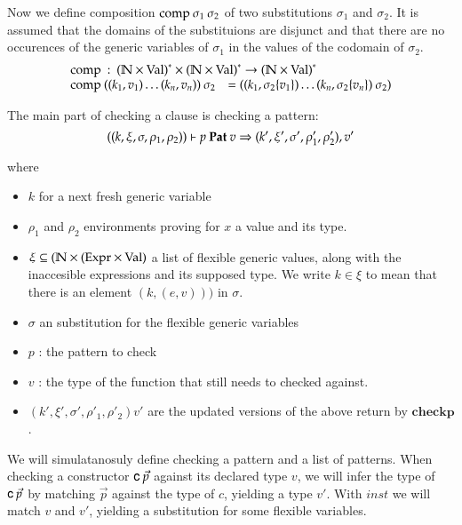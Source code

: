 Now we define composition $\mathrm{comp}\:\sigma_1\:\sigma_2$ of two substitutions $\sigma_1$ and $\sigma_2$.
It is assumed that the domains of the substituions are disjunct and that there are no occurences of the generic variables of $\sigma_1$ in the values of the codomain of $\sigma_2$.  
\[
\begin{array}{ll}
\multicolumn{2}{l}{\compS : \ves{(\cN \times \Val)} \times \ves{(\cN \times \Val)} \ra \ves{(\cN \times \Val)}} \\
\compS{((k_1,v_1)\ldots(k_n,v_n))}{\sigma_2} & = ((k_1,\subst{\sigma_2}{v_1})\ldots(k_n,\subst{\sigma_2}{v_n})\: \sigma_2) 
\end{array}
\]

The main part of checking a clause is checking a pattern:
\[
((k,\xi,\sigma,\rho_1,\rho_2))\vdash p\:\mathbf{Pat}\:v\Rightarrow (k',\xi',\sigma',\rho'_1,\rho'_2),v'
\]

where
\begin{itemize}
\item
$k$ for a next fresh generic variable
\item
$\rho_1$ and $\rho_2$ environments proving for $x$ a value and its type.
\item
$\xi \subseteq (\mathbb{N} \times (\mathrm{Expr} \times \mathrm{Val})$ a list of flexible generic values, along with the inaccesible expressions and its supposed type. We write $k \in \xi$ to mean that there is an element $(k,(e,v)))$ in $\sigma$. 
\item
$\sigma$ an substitution for the flexible generic variables
\item
$p$ : the pattern to check
\item
$v$ : the type of the function that still needs to checked against.
\item
$(k',\xi',\sigma',\rho'_1,\rho'_2){v'}$ are the updated versions of the above return by $\mathbf{checkp}$.
\end{itemize}

We will simulatanosuly define checking a pattern and a list of patterns.
When checking a constructor $\mathsf{c} \: \vec{p}$ against its declared type $v$,
we will infer the type of $\mathsf{c} \: \vec{p}$ by matching $\vec{p}$ against the type of $c$,
yielding a type $v'$. With $inst$ we will match $v$ and $v'$, yielding a substitution for some flexible variables.

